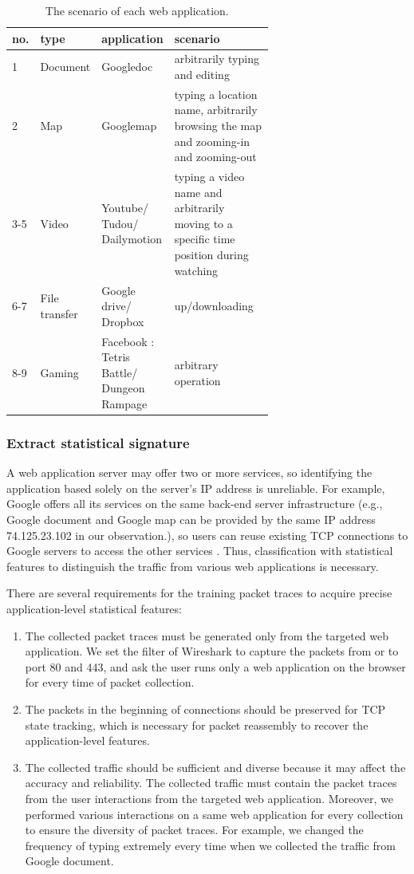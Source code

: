 \documentclass[preprint,12pt]{elsarticle}
\begin{document}
\begin{table}[ht]
\centering
\caption{The scenario of each web application.}
\begin{tabular}{|l|l|p{0.2\linewidth}|p{0.45\linewidth}|}
\hline no. &type &application &scenario \\
\hline
\hline 1 &Document &Googledoc & arbitrarily typing and editing\\
\hline 2 &Map  &Googlemap & typing a location name, arbitrarily browsing the map and zooming-in and zooming-out\\
\hline 3-5 &Video  & Youtube/ Tudou/ Dailymotion & typing a video name and arbitrarily moving to a specific time position during watching\\
\hline 6-7 &File transfer & Google drive/ Dropbox & up/downloading \\
\hline 8-9 &Gaming &Facebook : Tetris Battle/ Dungeon Rampage & arbitrary operation\\
\hline 
\end{tabular}
\label{table:scenario_app}
\end{table}



\subsubsection{Extract statistical signature}
A web application server may offer two or more services, so identifying the application based solely on the server's IP address is unreliable. For example, Google offers all its services on the same back-end server infrastructure (e.g., Google document and Google map can be provided by the same IP address 74.125.23.102 in our observation.), so users can reuse existing TCP connections to Google servers to access the other services \cite{TNW08}. Thus, classification with statistical features to distinguish the traffic from various web applications is necessary. 

There are several requirements for the training packet traces to acquire precise application-level statistical features:
\begin{enumerate}
\item 
The collected packet traces must be generated only from the targeted web application. We set the filter of Wireshark to capture the packets from or to port 80 and 443, and ask the user runs only a web application on the browser for every time of packet collection.
\item
The packets in the beginning of connections should be preserved for TCP state tracking, which is necessary for packet reassembly to recover the application-level features.
\item
The collected traffic should be sufficient and diverse because it may affect the accuracy and reliability. The collected traffic must contain the packet traces from the user interactions from the targeted web application. Moreover, we performed various interactions on a same web application for every collection to ensure the diversity of packet traces. For example, we changed the frequency of typing extremely every time when we collected the traffic from Google document.
\end{enumerate}
\end{document}
